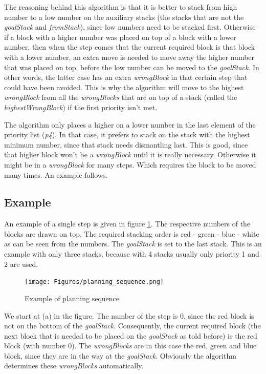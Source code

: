 \documentclass{article}
\begin{document}
	\par The reasoning behind this algorithm is that it is better to stack from high number to a low number on the auxiliary stacks (the stacks that are not the \textit{goalStack} and \textit{fromStack}), since low numbers need to be stacked first. 
	Otherwise if a block with a higher number was placed on top of a block with a lower number, then when the step comes that the current required block is that block with a lower number, an extra move is needed to move away the higher number that was placed on top, before the low number can be moved to the \textit{goalStack}. In other words, the latter case has an extra \textit{wrongBlock} in that certain step that could have been avoided. This is why the algorithm will move to the highest \textit{wrongBlock} from all the \textit{wrongBlocks} that are on top of a stack (called the \textit{highestWrongBlock}) if the first priority isn't met.
	
	\par The algorithm only places a higher on a lower number in the last element of the priority list (\textit{p4}). In that case, it prefers to stack on the stack with the highest minimum number, since that stack needs dismantling last. This is good, since that higher block won't be a \textit{wrongBlock} until it is really necessary. Otherwise it might be in a \textit{wrongBlock} for many steps. Which requires the block to be moved many times. An example follows.
	
	\subsection{Example}
	\par
	An example of a single step is given in figure \ref{fig:planning_example}. The respective numbers of the blocks are drawn on top. The required stacking order is red - green - blue - white as can be seen from the numbers. The \textit{goalStack} is set to the last stack. This is an example with only three stacks, because with 4 stacks usually only priority 1 and 2 are used. 
	\begin{figure}[H]
		\centering
		\texttt{[image: Figures/planning\_sequence.png]}
		\caption{Example of planning sequence}
		\label{fig:planning_example}
	\end{figure}
	
	\par We start at (a) in the figure. The number of the step is 0, since the red block is not on the bottom of the \textit{goalStack}. Consequently, the current required block (the next block that is needed to be placed on the \textit{goalStack} as told before) is the red block (with number 0). The \textit{wrongBlocks} are in this case the red, green and blue block, since they are in the way at the \textit{goalStack}. Obviously the algorithm determines these \textit{wrongBlocks} automatically.
	
\end{document}
